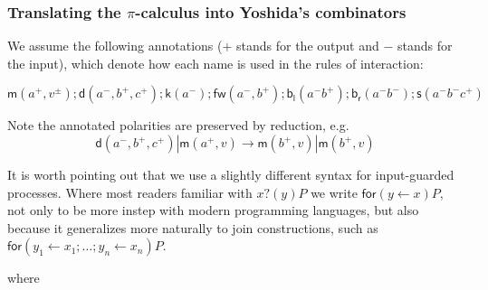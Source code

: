 \documentclass[submission,copyright,creativecommons]{eptcs}
\newcommand{\pic}{$\pi$-calculus}
\newcommand{\ldb}{[\![}
\newcommand{\rdb}{]\!]}
\newcommand{\binpar}[2]{#1 | #2}
\newcommand{\meaningof}[1]{\ldb #1 \rdb}
\theoremstyle{definition}
\theoremstyle{remark}
\theoremstyle{remark}
\begin{document}
\subsubsection{Translating the {\pic} into Yoshida's combinators}
We assume the following annotations ($+$ stands for the output and $-$
stands for the input), which denote how each name is used in the rules
of interaction:

\[\mathsf{m}(a^{+},v^{\pm});\mathsf{d}(a^{-},b^{+},c^{+});\mathsf{k}(a^{-});\mathsf{fw}(a^{-},b^{+});\mathsf{b}_{\mathsf{l}}(a^{-}b^{+});\mathsf{b}_{\mathsf{r}}(a^{-}b^{-});\mathsf{s}(a^{-}b^{-}c^{+})\]

Note the annotated polarities are preserved by reduction, e.g.
\[\binpar{\mathsf{d}(a^{-},b^{+},c^{+})}{\mathsf{m}(a^{+},v)} \to \binpar{\mathsf{m}(b^{+},v)}{\mathsf{m}(b^{+},v)}\]

It is worth pointing out that we use a slightly different syntax for input-guarded processes. Where most readers familiar with $x?(y)P$ we write $\mathsf{for}(y \leftarrow x)P$, not only to be more instep with modern programming languages, but also because it generalizes more naturally to join constructions, such as $\mathsf{for}(y_1 \leftarrow x_1; \ldots; y_n \leftarrow x_n)P$.


where
\end{document}

